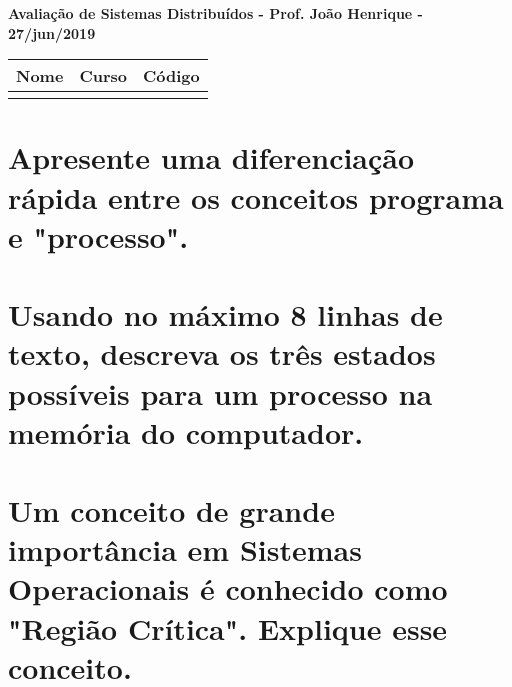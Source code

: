 \documentclass[11pt]{article}
\title{\vspace{-5ex}}
\date{{\vspace{-5ex}}}
\author{}
\begin{document}
\maketitle\thispagestyle{mystyle}

\begin{figure}[hbt]
\end{figure}

\begin{center}\textbf{Avaliação de Sistemas Distribuídos - Prof. João Henrique - 27/jun/2019}
\end{center}

\begin{tabularx}{468pt}{|X|X|c|}
\hline
\textbf{Nome} & \textbf{Curso} & \textbf{Código}\\
	\hline
	& & \\   
	\hline
\end{tabularx}

\section{Apresente uma diferenciação rápida entre os conceitos programa e "processo".}

\section{Usando no máximo 8 linhas de texto, descreva os três estados possíveis para um processo na memória do computador.}
\begin{linenumbers}
\resetlinenumber
\noindent\makebox[\linewidth]{\rule{\textwidth}{0.5pt}}
\noindent\makebox[\linewidth]{\rule{\textwidth}{0.5pt}}
\noindent\makebox[\linewidth]{\rule{\textwidth}{0.5pt}}
\noindent\makebox[\linewidth]{\rule{\textwidth}{0.5pt}}
\noindent\makebox[\linewidth]{\rule{\textwidth}{0.5pt}}
\noindent\makebox[\linewidth]{\rule{\textwidth}{0.5pt}}
\noindent\makebox[\linewidth]{\rule{\textwidth}{0.5pt}}
\noindent\makebox[\linewidth]{\rule{\textwidth}{0.5pt}}
\end{linenumbers}

\section{Um conceito de grande importância em Sistemas Operacionais é conhecido como "Região Crítica". Explique esse conceito.}
\begin{linenumbers}
\resetlinenumber
\noindent\makebox[\linewidth]{\rule{\textwidth}{0.5pt}}
\noindent\makebox[\linewidth]{\rule{\textwidth}{0.5pt}}
\noindent\makebox[\linewidth]{\rule{\textwidth}{0.5pt}}
\noindent\makebox[\linewidth]{\rule{\textwidth}{0.5pt}} \noindent\makebox[\linewidth]{\rule{\textwidth}{0.5pt}}
\end{linenumbers}
\end{document}
